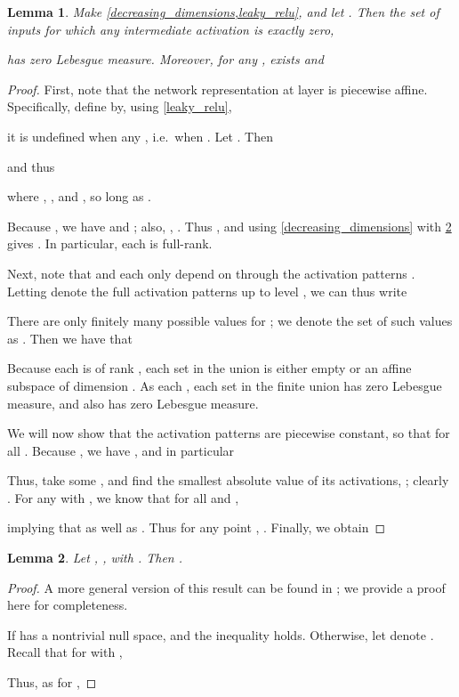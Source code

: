 \documentclass{article}
\newtheorem{lem}{Lemma}
\begin{document}
\begin{lem} \label{lem:grad_essinf}
Make \cref{decreasing_dimensions,leaky_relu}, and let .
Then the set of inputs for which any intermediate activation is exactly zero,

has zero Lebesgue measure.
Moreover, for any ,
 exists and

\end{lem}
\begin{proof}
First, note that the network representation at layer  is piecewise affine.
Specifically,
define  by, using \cref{leaky_relu},

it is undefined when any ,
i.e.\ when .
Let .
Then

and thus

where
, ,
and ,
so long as .

Because ,
we have  and ;
also, , .
Thus ,
and using \cref{decreasing_dimensions} with \cref{lem:min-sv}
gives .
In particular, each  is full-rank.



Next, note that  and 
each only depend on  through the activation patterns .
Letting  denote the full activation patterns up to level ,
we can thus write

There are only finitely many possible values for ;
we denote the set of such values as .
Then we have that

Because each  is of rank ,
each set in the union is either empty
or an affine subspace of dimension .
As each ,
each set in the finite union has zero Lebesgue measure,
and  also has zero Lebesgue measure.

We will now show that the activation patterns are piecewise constant,
so that  for all .
Because ,
we have ,
and in particular

Thus, take some ,
and find the smallest absolute value of its activations,
;
clearly .
For any  with ,
we know that for all  and ,

implying that
 as well as .
Thus for any point ,
.
Finally, we obtain

\end{proof}

\begin{lem} \label{lem:min-sv}
  Let , , with . Then
  .
\end{lem}
\begin{proof}
A more general version of this result can be found in \cite[Theorem 2]{Gungor:2007}; we provide a proof here for completeness.

  If  has a nontrivial null space,  and the inequality holds.
  Otherwise, let  denote .
  Recall that for  with ,
  
  Thus, as  for ,
  
\end{proof}
\end{document}
